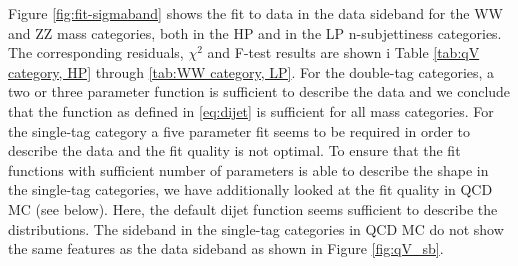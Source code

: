 Figure \ref{fig:fit-sigmaband} shows the fit to data in the data sideband for the WW and ZZ  mass categories, both in the HP and in the LP n-subjettiness categories. The corresponding residuals, $\chi^2$ and F-test results are shown i Table \ref{tab:qV category, HP} through \ref{tab:WW category, LP}. For the double-tag categories, a two or three parameter function is sufficient to describe the data and we conclude that the function as defined in \ref{eq:dijet} is sufficient for all mass categories. For the single-tag category a five parameter fit seems to be required in order to describe the data and the fit quality is not optimal. To ensure that the fit functions with sufficient number of parameters is able to describe the shape in the single-tag categories, we have additionally looked at the fit quality in QCD MC (see below). Here, the default dijet function seems sufficient to describe the distributions.
The sideband in the single-tag categories in QCD MC do not show the same features as the data sideband as shown in Figure \ref{fig:qV_sb}.




